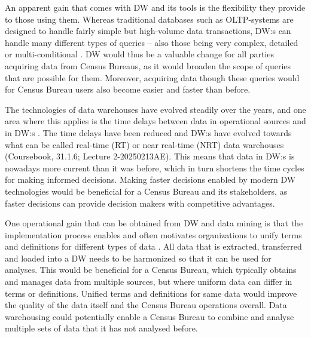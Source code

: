 An apparent gain that comes with DW and its tools is the flexibility they provide to those using them. 
Whereas traditional databases such as OLTP-systems are designed to handle fairly simple but high-volume data transactions, DW:s can handle many
different types of queries -- also those being very complex, detailed or multi-conditional \cite[chapter~31.1.4]{CourseLitt}. 
DW would thus be a valuable change for all parties acquiring data from Census Bureaus, 
as it would broaden the scope of queries that are possible for them. 
Moreover, acquiring data though these queries would for Census Bureau users also become easier and faster than before.

The technologies of data warehouses have evolved steadily over the years, 
and one area where this applies is the time delays between data in operational sources and in DW:s \cite[chapter~31.1.6]{CourseLitt}. 
The time delays have been reduced and DW:s have evolved towards what can be called real-time (RT) or near real-time (NRT) data warehouses (Coursebook, 31.1.6; Lecture 2-20250213AE). 
This means that data in DW:s is nowadays more current than it was before, 
which in turn shortens the time cycles for making informed decisions. 
Making faster decisions enabled by modern DW technologies would be beneficial for a Census Bureau and its stakeholders, 
as faster decisions can provide decision makers with competitive advantages.

One operational gain that can be obtained from DW and data mining is that the implementation process enables and often motivates organizations to
unify terms and definitions for different types of data \cite{l2video}. 
All data that is extracted, transferred and loaded into a DW needs to be harmonized so that it can be used for analyses. 
This would be beneficial for a Census Bureau, which typically obtains and manages data from multiple sources, 
but where uniform data can differ in terms or definitions. 
Unified terms and definitions for same data would improve the quality of the data itself and the Census Bureau operations overall.
Data warehousing could potentially enable a Census Bureau to combine and analyse multiple sets of data that it has not analysed before.

